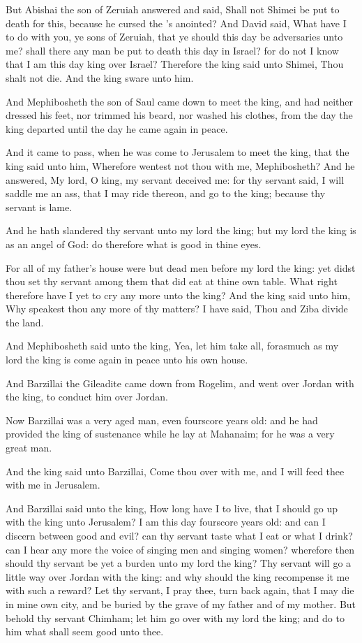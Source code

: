 \Verse But Abishai the son of Zeruiah answered and said, Shall not Shimei be put to death for this, because he cursed the \LORD's anointed?  \Verse And David said, What have I to do with you, ye sons of Zeruiah, that ye should this day be adversaries unto me? shall there any man be put to death this day in Israel? for do not I know that I am this day king over Israel?  \Verse Therefore the king said unto Shimei, Thou shalt not die. And the king sware unto him.

\Verse And Mephibosheth the son of Saul came down to meet the king, and had neither dressed his feet, nor trimmed his beard, nor washed his clothes, from the day the king departed until the day he came again in peace.

\Verse And it came to pass, when he was come to Jerusalem to meet the king, that the king said unto him, Wherefore wentest not thou with me, Mephibosheth?  \Verse And he answered, My lord, O king, my servant deceived me: for thy servant said, I will saddle me an ass, that I may ride thereon, and go to the king; because thy servant is lame.

\Verse And he hath slandered thy servant unto my lord the king; but my lord the king is as an angel of God: do therefore what is good in thine eyes.

\Verse For all of my father's house were but dead men before my lord the king: yet didst thou set thy servant among them that did eat at thine own table. What right therefore have I yet to cry any more unto the king?  \Verse And the king said unto him, Why speakest thou any more of thy matters? I have said, Thou and Ziba divide the land.

\Verse And Mephibosheth said unto the king, Yea, let him take all, forasmuch as my lord the king is come again in peace unto his own house.

\Verse And Barzillai the Gileadite came down from Rogelim, and went over Jordan with the king, to conduct him over Jordan.

\Verse Now Barzillai was a very aged man, even fourscore years old: and he had provided the king of sustenance while he lay at Mahanaim; for he was a very great man.

\Verse And the king said unto Barzillai, Come thou over with me, and I will feed thee with me in Jerusalem.

\Verse And Barzillai said unto the king, How long have I to live, that I should go up with the king unto Jerusalem?  \Verse I am this day fourscore years old: and can I discern between good and evil? can thy servant taste what I eat or what I drink? can I hear any more the voice of singing men and singing women? wherefore then should thy servant be yet a burden unto my lord the king?  \Verse Thy servant will go a little way over Jordan with the king: and why should the king recompense it me with such a reward?  \Verse Let thy servant, I pray thee, turn back again, that I may die in mine own city, and be buried by the grave of my father and of my mother. But behold thy servant Chimham; let him go over with my lord the king; and do to him what shall seem good unto thee.

